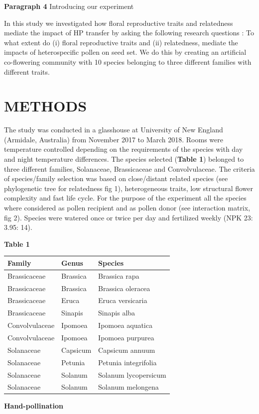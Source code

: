\documentclass[11pt,a4paper]{article}
\begin{document}
\textbf{Paragraph 4} Introducing our experiment

In this study we investigated how floral reproductive traits and
relatedness mediate the impact of HP transfer by asking the following
research questions : To what extent do (i) floral reproductive traits
and (ii) relatedness, mediate the impacts of heterospecific pollen on
seed set. We do this by creating an artificial co-flowering community
with 10 species belonging to three different families with different
traits.

\section{METHODS}\label{methods}

The study was conducted in a glasshouse at University of New England
(Armidale, Australia) from November 2017 to March 2018. Rooms were
temperature controlled depending on the requirements of the species with
day and night temperature differences. The species selected
(\textbf{Table 1}) belonged to three different families, Solanaceae,
Brassicaceae and Convolvulaceae. The criteria of species/family
selection was based on close/distant related species (see phylogenetic
tree for relatedness fig 1), heterogeneous traits, low structural flower
complexity and fast life cycle. For the purpose of the experiment all
the species where considered as pollen recipient and as pollen donor
(see interaction matrix, fig 2). Species were watered once or twice per
day and fertilized weekly (NPK 23: 3.95: 14).

\textbf{Table 1}

\begin{longtable}[]{@{}lll@{}}
\toprule
Family & Genus & Species\tabularnewline
\midrule
\endhead
Brassicaceae & Brassica & Brassica rapa\tabularnewline
Brassicaceae & Brassica & Brassica oleracea\tabularnewline
Brassicaceae & Eruca & Eruca versicaria\tabularnewline
Brassicaceae & Sinapis & Sinapis alba\tabularnewline
Convolvulaceae & Ipomoea & Ipomoea aquatica\tabularnewline
Convolvulaceae & Ipomoea & Ipomoea purpurea\tabularnewline
Solanaceae & Capsicum & Capsicum annuum\tabularnewline
Solanaceae & Petunia & Petunia integrifolia\tabularnewline
Solanaceae & Solanum & Solanum lycopersicum\tabularnewline
Solanaceae & Solanum & Solanum melongena\tabularnewline
\bottomrule
\end{longtable}

\textbf{Hand-pollination}
\end{document}

